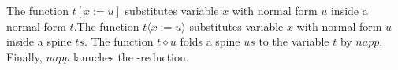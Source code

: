 \begin{code}
\AgdaOperator{\AgdaFunction{:=}}\AgdaSpace{}%
\AgdaSpace{}%
\AgdaOperator{\AgdaFunction{>}}\AgdaSymbol{)}\<%
\\
%
\\[\AgdaEmptyExtraSkip]%
%
\>[2]\AgdaSpace{}%
\AgdaSymbol{:}\AgdaSpace{}%
\AgdaSpace{}%
\AgdaSpace{}%
\AgdaSpace{}%
\AgdaSpace{}%
\AgdaSpace{}%
\AgdaSpace{}%
\AgdaSpace{}%
\AgdaSpace{}%
\AgdaSpace{}%
\AgdaSpace{}%
\AgdaSpace{}%
\<%
\\
%
\>[2]\AgdaSpace{}%
\AgdaSpace{}%
\AgdaSpace{}%
\AgdaSymbol{=}\AgdaSpace{}%
\<%
\\
%
\>[2]\AgdaSpace{}%
\AgdaSpace{}%
\AgdaSymbol{(}\AgdaSpace{}%
\AgdaOperator{\AgdaInductiveConstructor{,}}\AgdaSpace{}%
\AgdaSymbol{)}\AgdaSpace{}%
\AgdaSymbol{=}\AgdaSpace{}%
\AgdaSpace{}%
\AgdaSpace{}%
\AgdaSpace{}%
\AgdaSpace{}%
\<%
\\
%
\\[\AgdaEmptyExtraSkip]%
%
\>[2]\AgdaSpace{}%
\AgdaSymbol{:}\AgdaSpace{}%
\AgdaSpace{}%
\AgdaSpace{}%
\AgdaSymbol{(}\AgdaSpace{}%
\AgdaSpace{}%
\AgdaSymbol{)}\AgdaSpace{}%
\AgdaSpace{}%
\AgdaSpace{}%
\AgdaSpace{}%
\AgdaSpace{}%
\AgdaSpace{}%
\AgdaSpace{}%
\AgdaSpace{}%
\<%
\\
%
\>[2]\AgdaSpace{}%
\AgdaSymbol{(}\AgdaSpace{}%
\AgdaSymbol{)}\AgdaSpace{}%
\AgdaSpace{}%
\AgdaSymbol{=}\AgdaSpace{}%
\AgdaSpace{}%
\AgdaOperator{\AgdaFunction{[}}\AgdaSpace{}%
\AgdaSpace{}%
\AgdaOperator{\AgdaFunction{:=}}\AgdaSpace{}%
\AgdaSpace{}%
\AgdaOperator{\AgdaFunction{]}}\<%
\end{code}

The function $t [ x := u ]$ substitutes variable $x$ with normal form $u$ inside a normal form $t$.The function $t \langle x := u \rangle$ substitutes variable $x$ with normal form $u$ inside a spine $ts$. The function $t \diamond u$ folds a spine $us$ to the variable $t$ by $napp$. Finally, $napp$ launches the \beta-reduction.

